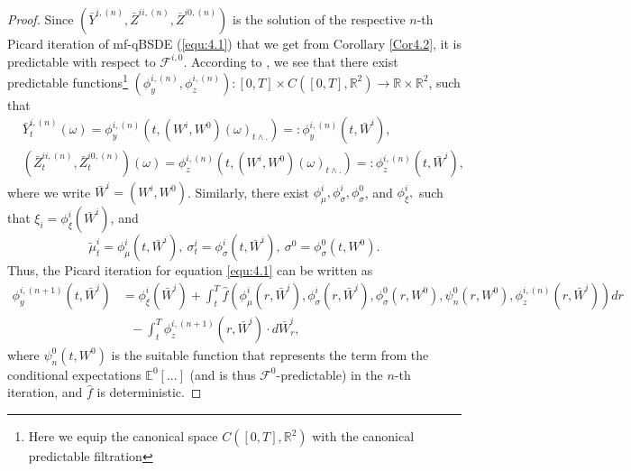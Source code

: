 \documentclass[10pt,a4paper]{article}
\newcommand{\R}{\mathbb{R}}
\newcommand{\be}{\begin{equation}}
\newcommand{\ee}{\end{equation}}
\newcommand{\MF}{{\mathcal{F}}}
\theoremstyle{plain}
\theoremstyle{definition}
\numberwithin{equation}{section}
\begin{document}
\begin{proof}

Since $(\bar{Y}^{i,(n)}, \bar{Z}^{ii,(n)}, \bar{Z}^{i0,(n)})$ is the solution of the respective $n$-th Picard iteration of mf-qBSDE (\ref{equ:4.1}) that we get from Corollary \ref{Cor4.2}, it is predictable with respect to $\MF^{i,0}$. According to \cite[Proposition 10]{CTT16}, we see that there exist predictable functions\footnote{Here we equip the canonical space $C([0,T], \R^{2})$ with the canonical predictable filtration} $(\phi_y^{i,(n)}, \phi_z^{i,(n)}  ): [0,T] \times C([0,T], \R^{2}) \rightarrow \R \times \R^2$, such that 
\be
\begin{split}
&\bar{Y}_{t}^{i,(n)}(\omega)=\phi_y^{i,(n)}(t,(W^i,W^0)(\omega)_{t \wedge . })=:\phi^{i,(n)}_y(t,\bar{W}^i),\\
& ( \bar{Z}^{ii,(n)}_t, \bar{Z}^{i0,(n)}_t )(\omega)=\phi_z^{i,(n)} (t,(W^i,W^0)(\omega)_{t \wedge . })=:\phi^{i,(n)}_z(t,\bar{W}^i),    
\end{split}
\ee
where we write $\bar W^i=(W^i, W^0)$.
Similarly, there exist $ \phi_\mu^i, \phi_{\sigma}^i, \phi_{\sigma}^0$, and $\phi_\xi^i,$ such that 
$\xi_{i} = \phi_{\xi}^i(\bar{W}^i )$, and 
$$
 \tilde{\mu}^{i}_t = \phi_{\mu}^i(t,\bar{W}^i ) ,\ \sigma^{i}_t = \phi_{\sigma}^i (t,\bar{W}^i), \ \sigma^{0} = \phi_{\sigma}^0(t,W^0 ). 
$$
Thus, the Picard iteration for equation \eqref{equ:4.1} can be written as 
\be
\begin{split}
\phi_{y}^{i,(n+1)}(t,\bar W^i) &= \phi_{\xi}^{i}(\bar{W}^{i}) + \int_{t}^{T}\hat{f}(\phi_{\mu}^i (r,\bar W^i) ,\phi_{\sigma}^i(r,\bar W^i) ,\phi_{\sigma}^{0}(r, W^0),\psi_{n}^{0}(r,W^{0}),\phi_{z}^{i,(n)}(r,\bar W^i) ) dr  \\
&\ \ \ - \int_{t}^{T}\phi_{z}^{i,(n+1)}(r,\bar W^i) \cdot d \bar{W}^i_r, \label{equ:newiid1}    
\end{split}
\ee
where $\psi_{n}^{0}(t,W^{0})$ is the suitable function that represents the term from the conditional expectations $\mathbb{E}^{0}[...]$ (and is thus $\mathcal{F}^{0}$-predictable) in the $n$-th iteration, and $\hat f$ is deterministic.


\end{proof}
\end{document}
